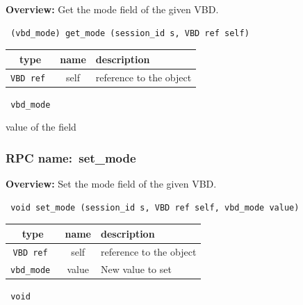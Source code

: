 {\bf Overview:} 
Get the mode field of the given VBD.

\begin{verbatim} (vbd_mode) get_mode (session_id s, VBD ref self)\end{verbatim}



 
\vspace{0.3cm}
\begin{tabular}{|c|c|p{7cm}|}
 \hline
{\bf type} & {\bf name} & {\bf description} \\ \hline
{\tt VBD ref } & self & reference to the object \\ \hline 

\end{tabular}

\vspace{0.3cm}

{\tt 
vbd\_mode
}


value of the field
\vspace{0.3cm}
\vspace{0.3cm}
\vspace{0.3cm}
\subsubsection{RPC name:~set\_mode}

{\bf Overview:} 
Set the mode field of the given VBD.

\begin{verbatim} void set_mode (session_id s, VBD ref self, vbd_mode value)\end{verbatim}



 
\vspace{0.3cm}
\begin{tabular}{|c|c|p{7cm}|}
 \hline
{\bf type} & {\bf name} & {\bf description} \\ \hline
{\tt VBD ref } & self & reference to the object \\ \hline 

{\tt vbd\_mode } & value & New value to set \\ \hline 

\end{tabular}

\vspace{0.3cm}

{\tt 
void
}



